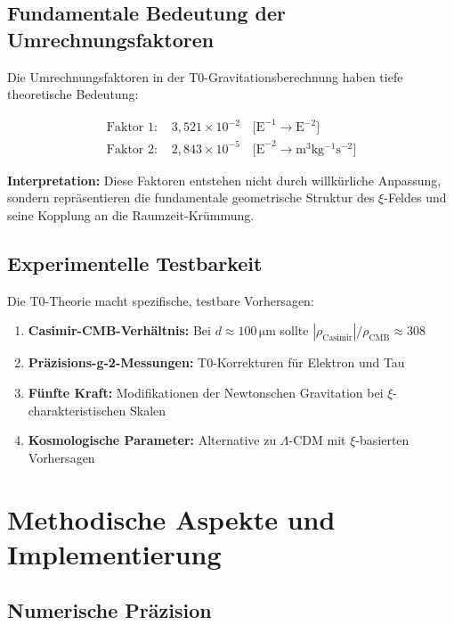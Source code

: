 \documentclass[11pt,a4paper]{article}
\begin{document}
	\subsection{Fundamentale Bedeutung der Umrechnungsfaktoren}
	
	Die Umrechnungsfaktoren in der T0-Gravitationsberechnung haben tiefe theoretische Bedeutung:
	
	\begin{align}
		\text{Faktor 1: } &3{,}521 \times 10^{-2} \quad \text{[E}^{-1} \rightarrow \text{E}^{-2}\text{]} \\
		\text{Faktor 2: } &2{,}843 \times 10^{-5} \quad \text{[E}^{-2} \rightarrow \si{\meter^3 \kilogram^{-1} \second^{-2}}\text{]}
	\end{align}
	
	\textbf{Interpretation:} Diese Faktoren entstehen nicht durch willkürliche Anpassung, sondern repräsentieren die fundamentale geometrische Struktur des $\xi$-Feldes und seine Kopplung an die Raumzeit-Krümmung.
	
	\subsection{Experimentelle Testbarkeit}
	
	Die T0-Theorie macht spezifische, testbare Vorhersagen:
	
	\begin{enumerate}
		\item \textbf{Casimir-CMB-Verhältnis:} Bei $d \approx 100\,\si{\micro\meter}$ sollte $|\rho_{\text{Casimir}}|/\rho_{\text{CMB}} \approx 308$
		\item \textbf{Präzisions-g-2-Messungen:} T0-Korrekturen für Elektron und Tau
		\item \textbf{Fünfte Kraft:} Modifikationen der Newtonschen Gravitation bei $\xi$-charakteristischen Skalen
		\item \textbf{Kosmologische Parameter:} Alternative zu $\Lambda$-CDM mit $\xi$-basierten Vorhersagen
	\end{enumerate}
	
	\section{Methodische Aspekte und Implementierung}
	
	\subsection{Numerische Präzision}
	
\end{document}
